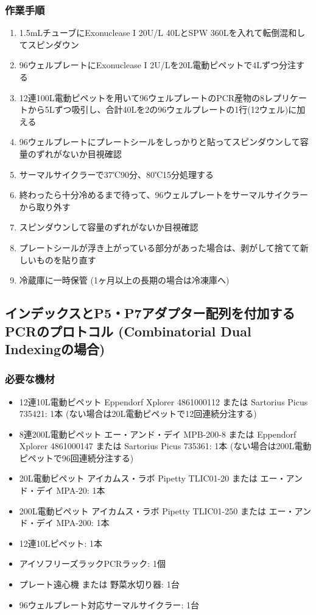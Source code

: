 \documentclass[titlepage,10pt,a4paper,uplatex]{jsbook}
\begin{document}
\subsubsection{作業手順}
\begin{enumerate}
\item 1.5mLチューブにExonuclease I 20U/{\textmu}L 40{\textmu}LとSPW 360{\textmu}Lを入れて転倒混和してスピンダウン
\item 96ウェルプレートにExonuclease I 2U/{\textmu}Lを20{\textmu}L電動ピペットで4{\textmu}Lずつ分注する
\item 12連100{\textmu}L電動ピペットを用いて96ウェルプレートのPCR産物の8レプリケートから5{\textmu}Lずつ吸引し、合計40{\textmu}Lを2の96ウェルプレートの1行(12ウェル)に加える
\item 96ウェルプレートにプレートシールをしっかりと貼ってスピンダウンして容量のずれがないか目視確認
\item サーマルサイクラーで37℃90分、80℃15分処理する
\item 終わったら十分冷めるまで待って、96ウェルプレートをサーマルサイクラーから取り外す
\item スピンダウンして容量のずれがないか目視確認
\item プレートシールが浮き上がっている部分があった場合は、剥がして捨てて新しいものを貼り直す
\item 冷蔵庫に一時保管 (1ヶ月以上の長期の場合は冷凍庫へ)
\end{enumerate}

\subsection{インデックスとP5・P7アダプター配列を付加するPCRのプロトコル (Combinatorial Dual Indexingの場合)}

\subsubsection{必要な機材}
\begin{itemize}
\item 12連10{\textmu}L電動ピペット Eppendorf Xplorer 4861000112 または Sartorius Picus 735421: 1本 (ない場合は20{\textmu}L電動ピペットで12回連続分注する)
\item 8連200{\textmu}L電動ピペット エー・アンド・デイ MPB-200-8 または Eppendorf Xplorer 4861000147 または Sartorius Picus 735361: 1本 (ない場合は200{\textmu}L電動ピペットで96回連続分注する)
\item 20{\textmu}L電動ピペット アイカムス・ラボ Pipetty TLIC01-20 または エー・アンド・デイ MPA-20: 1本
\item 200{\textmu}L電動ピペット アイカムス・ラボ Pipetty TLIC01-250 または エー・アンド・デイ MPA-200: 1本
\item 12連10{\textmu}Lピペット: 1本
\item アイソフリーズラックPCRラック: 1個
\item プレート遠心機 または 野菜水切り器: 1台
\item 96ウェルプレート対応サーマルサイクラー: 1台
\end{itemize}
\end{document}
